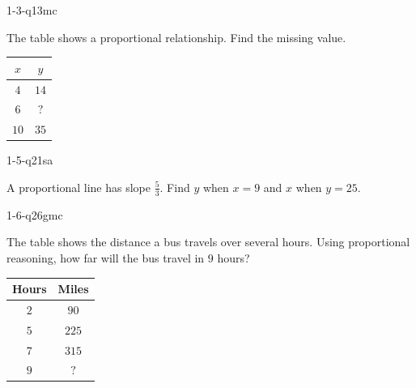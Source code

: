
\begin{practiceQuestion}{1-3-q13}{mc}
\begin{questionText}
The table shows a proportional relationship. Find the missing value.

\begin{center}
\begin{tabular}{|c|c|}
\hline $x$ & $y$ \\ \hline $4$ & $14$ \\ $6$ & $?$ \\ $10$ & $35$ \\ \hline
\end{tabular}
\end{center}
\end{questionText}
\end{practiceQuestion}

\begin{practiceQuestion}{1-5-q21}{sa}
\begin{questionText}
A proportional line has slope $\frac{5}{3}$. Find $y$ when $x = 9$ and $x$ when $y = 25$.
\end{questionText}
\end{practiceQuestion}

\begin{practiceQuestion}{1-6-q26}{gmc}
\begin{questionText}
The table shows the distance a bus travels over several hours. Using proportional reasoning, how far will the bus travel in $9$ hours?

\begin{center}
\begin{tabular}{|c|c|}
\hline
\textbf{Hours} & \textbf{Miles} \\ \hline
$2$ & $90$ \\ \hline
$5$ & $225$ \\ \hline
$7$ & $315$ \\ \hline
$9$ & $?$ \\ \hline
\end{tabular}
\end{center}
\end{questionText}
\end{practiceQuestion}

